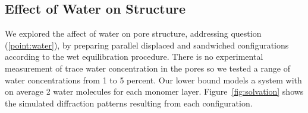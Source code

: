 \documentclass[journal=jpcbfk,manusciprt=article]{achemso}
\begin{document}
  \subsection{Effect of Water on Structure}



  We explored the affect of water on pore structure, addressing question
  (\ref{point:water}), by preparing parallel displaced and sandwiched
  configurations according to the wet equilibration procedure. There is no
  experimental measurement of trace water concentration in the pores so we tested
  a range of water concentrations from 1 to 5 percent. Our lower bound models a
  system with on average 2 water molecules for each monomer layer.
  Figure~\ref{fig:solvation} shows the simulated diffraction patterns resulting
  from each configuration.

  \newlength{\tempdima}
  \newcommand{\rowname}[1]%
  {\rotatebox{90}{\makebox[\tempdima][c]{\textbf{#1}}}}
  
  \renewcommand{\thesubfigure}{\alph{subfigure}}
  \newcommand{\mycaption}[1]%
  {\refstepcounter{subfigure}\textbf{(\thesubfigure) }{\ignorespaces #1}}
  
\end{document}
